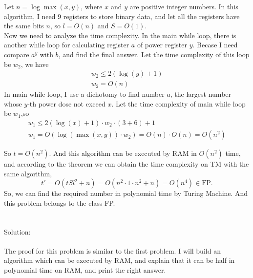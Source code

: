 \documentclass[a4papper]{article}
\theoremstyle{neosn}
\begin{document}
    Let $n = \log{\max{(x,y)}}$, where $x$ and $y$ are positive integer numbers.
    In this algorithm, I need 9 registers to store binary data, and let all the registers
    have the same bits $n$, so $l = O(n)$ and $S = O(1)$. \\
    Now we need to analyze the time complexity.
    In the main while loop, there is another while loop for calculating register $a$ of
    power register $y$.
    Becase I need compare $a^y$ with $b$, and find the final answer.
    Let the time complexity of this loop be $w_2$, we have
    \[
        \begin{array}{l}
            w_2 \leqslant 2(\log(y) + 1) \\
            w_2 = O(n)
        \end{array}
    \]
    In main while loop, I use a dichotomy to find number $a$, the largest number whose $y$-th power
    dose not exceed $x$.
    Let the time complexity of main while loop be $w_1$,so
    \[
        \begin{array}{l}
            w_1 \leqslant 2(\log(x) + 1) \cdot w_2 \cdot (3+6) + 1 \\
            w_1 = O(\log (\max{(x,y)}) \cdot w_2) = O(n)\cdot O(n) = O(n^2)
        \end{array}

    \]

    So $t = O(n^2)$.
    And this algorithm can be executed by RAM in $O(n^2)$ time, and according to the
    theorem we can obtain the time complexity on TM with the same algorithm,
    \[
        t' = O(tSl^2+n) = O(n^2\cdot 1 \cdot n^2+n) = O(n^4) \in \text{FP}.
    \]
    So, we can find the required number in polynomial time by Turing Machine.
    And this problem belongs to the class FP\@. \\


     \\
    \\
    Solution: \\

    \\
    The proof for this problem is similar to the first problem.
    I will build an algorithm which can be executed by RAM, and explain that
    it can be half in polynomial time on RAM, and print the right answer. \\
\end{document}
